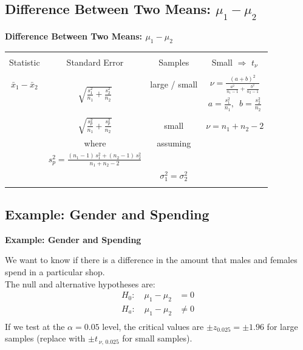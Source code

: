 \documentclass[compress]{beamer}        %
\makeatletter
\newcommand{\tcb}{\textcolor{beamer@blendedblue}}
\makeatother
\begin{document}
\subsection{Difference Between Two Means: $\mu_1-\mu_2$}
\begin{frame}{\bf \tcb{Difference Between Two Means: $\mu_1-\mu_2$\\[-0.8cm]}}
\begin{center}
\begin{small}
\begin{tabular}{|c|c|c|c|}
\hline
&&&\\[-0.1cm]
 Statistic & Standard Error & Samples &  Small $\Rightarrow$ $t_\nu$ \\[0.3cm]
\hline
&&&\\[-0.1cm]
$\bar x_1 - \bar x_2$ & \multirow{3}{*}{${\displaystyle\sqrt{\frac{s_1^2}{n_1}+\frac{s_2^2}{n_2}}}$} & large / small & ${\displaystyle \nu = \frac{(a+b)^2}{\frac{a^2}{n_1-1}+\frac{b^2}{n_2-1}}}$ \\[0.8cm]
&&& ${\displaystyle a=\frac{s_1^2}{n_1}, \,\,\, b=\frac{s_2^2}{n_2}}$ \\[0.5cm]
\cline{2-4}
&&&\\[-0.1cm]
  & ${\displaystyle\sqrt{\frac{s_p^2}{n_1}+\frac{s_p^2}{n_2}}}$ & small & $\nu = n_1+n_2-2$ \\[0.6cm]
&where&assuming& \\[0.2cm]
&${\displaystyle s_p^2 = \frac{(n_1-1)\,s_1^2+(n_2-1)\,s_2^2}{n_1+n_2-2}}$& & \\[-1cm]
&& $\sigma_1^2 = \sigma_2^2$& \\[0.7cm]
\hline
\multicolumn{4}{c}{}\\[0.5cm]
\end{tabular}
\end{small}
\end{center}
\end{frame}



\subsection{Example: Gender and Spending}
\begin{frame}{\bf \tcb{Example: Gender and Spending}}

We want to know if there is a difference in the amount that males and females spend in a particular shop.\\[0.8cm]%
 The null and alternative hypotheses are:\\[-0.2cm]
\begin{align*}
H_0:\quad \mu_1-\mu_2 &= 0 \\[0.2cm]
H_a:\quad \mu_1-\mu_2 &\ne 0 \\[-0.2cm]
\end{align*}
If we test at the $\alpha=0.05$ level, the critical values are $\pm z_{0.025} = \pm 1.96$ for large samples {\footnotesize(replace with $\pm t_{\,\nu,\,0.025}$ for small samples)}.

\end{frame}
\end{document}
